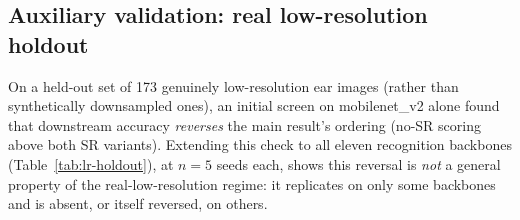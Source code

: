 \documentclass[11pt]{article}
\begin{document}
\subsection{Auxiliary validation: real low-resolution holdout}
\label{sec:res-lr-holdout}

On a held-out set of 173 genuinely low-resolution ear images (rather than synthetically downsampled ones), an initial screen on mobilenet\_v2 alone found that downstream accuracy \emph{reverses} the main result's ordering (no-SR scoring above both SR variants). Extending this check to all eleven recognition backbones (Table~\ref{tab:lr-holdout}), at $n=5$ seeds each, shows this reversal is \emph{not} a general property of the real-low-resolution regime: it replicates on only some backbones and is absent, or itself reversed, on others.
\end{document}
